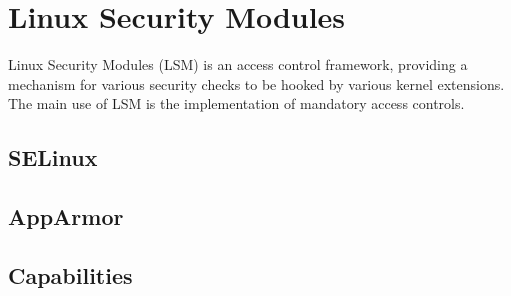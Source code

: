 
\section{Linux Security Modules}

Linux Security Modules (LSM) is an access control framework, providing a
mechanism for various security checks to be hooked by various kernel
extensions\cite{wright-et-al-2002,lsm.txt}. The main use of LSM is the
implementation of mandatory access controls.

\subsection{SELinux}

\subsection{AppArmor}

\subsection{Capabilities}

